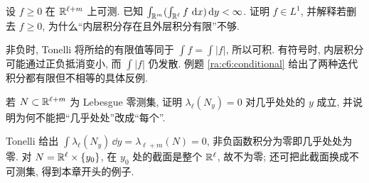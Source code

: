 \begin{exercise}
设 $f\ge0$ 在 $\mathbb R^{\ell+m}$ 上可测. 已知 $\int_{\mathbb R^m}(\int_{\mathbb R^\ell}f\,\,\mathrm d x)\,\mathrm d y<\infty$. 证明 $f\in L^1$, 并解释若删去 $f\ge0$, 为什么“内层积分存在且外层积分有限”不够.
\end{exercise}
\begin{solution}
非负时, Tonelli 将所给的有限值等同于 $\int f=\int|f|$, 所以可积. 有符号时, 内层积分可能通过正负抵消变小, 而 $\int|f|$ 仍发散. 例题 \ref{ra:c6:conditional} 给出了两种迭代积分都有限但不相等的具体反例.
\end{solution}

\begin{exercise}
若 $N\subset\mathbb R^{\ell+m}$ 为 Lebesgue 零测集, 证明 $\lambda_\ell(N_y)=0$ 对几乎处处的 $y$ 成立, 并说明为何不能把“几乎处处”改成“每个”.
\end{exercise}
\begin{solution}
Tonelli 给出 $\int\lambda_\ell(N_y)\,\dd y=\lambda_{\ell+m}(N)=0$, 非负函数积分为零即几乎处处为零. 对 $N=\mathbb R^\ell\times\{y_0\}$, 在 $y_0$ 处的截面是整个 $\mathbb R^\ell$, 故不为零; 还可把此截面换成不可测集, 得到本章开头的例子.
\end{solution}
